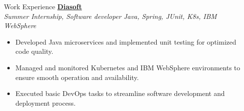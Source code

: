 \documentclass{resume} %
\begin{document}
\begin{rSection}{Work Experience}
{\bf \href{https://diasoft.com/}{Diasoft} } \hfill {} \; 
\\{\textit{ Summer Internship, Software developer }} \hfill {\textit{Java, Spring, JUnit, K8s, IBM WebSphere}}
\begin{itemize}
    \item Developed Java microservices and implemented unit testing for optimized code quality.
    \item Managed and monitored Kubernetes and IBM WebSphere environments to ensure smooth operation and availability.
    \item Executed basic DevOps tasks to streamline software development and deployment process.
\end{itemize}

\end{rSection}
\end{document}
